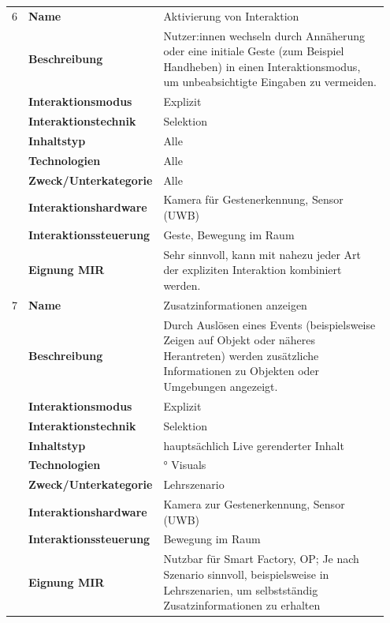 \begin{longtable}{p{0.03\linewidth} p{0.27\linewidth}
    >{\raggedright\arraybackslash}p{0.65\linewidth}}
    6  & \textbf{Name} & Aktivierung von Interaktion \\
        & \textbf{Beschreibung} & Nutzer:innen wechseln durch Annäherung oder eine initiale Geste (zum Beispiel Handheben) in einen Interaktionsmodus, um unbeabsichtigte Eingaben zu vermeiden. \\
        & \textbf{Interaktionsmodus} & Explizit \\
        & \textbf{Interaktionstechnik} & Selektion \\
        & \textbf{Inhaltstyp} & Alle \\
        & \textbf{Technologien} & Alle \\
        & \textbf{Zweck/Unterkategorie} & Alle \\
        & \textbf{Interaktionshardware} & Kamera für Gestenerkennung, Sensor (UWB) \\
        & \textbf{Interaktionssteuerung} & Geste, Bewegung im Raum \\
        & \textbf{Eignung MIR} & Sehr sinnvoll, kann mit nahezu jeder Art der expliziten Interaktion kombiniert werden. \\
        \midrule

    7   & \textbf{Name} & Zusatzinformationen anzeigen \\
        & \textbf{Beschreibung} & Durch Auslösen eines Events (beispielsweise Zeigen auf Objekt oder näheres Herantreten) werden zusätzliche Informationen zu Objekten oder Umgebungen angezeigt. \\
        & \textbf{Interaktionsmodus} & Explizit \\
        & \textbf{Interaktionstechnik} & Selektion \\
        & \textbf{Inhaltstyp} & hauptsächlich Live gerenderter Inhalt \\
        & \textbf{Technologien} & 270° Visuals \\
        & \textbf{Zweck/Unterkategorie} & Lehrszenario \\
        & \textbf{Interaktionshardware} & Kamera zur Gestenerkennung, Sensor (UWB) \\
        & \textbf{Interaktionssteuerung} & Bewegung im Raum \\
        & \textbf{Eignung MIR} & Nutzbar für Smart Factory, OP; Je nach Szenario sinnvoll, beispielsweise in Lehrszenarien, um selbstständig Zusatzinformationen zu erhalten  \\
    \midrule


\end{longtable}
